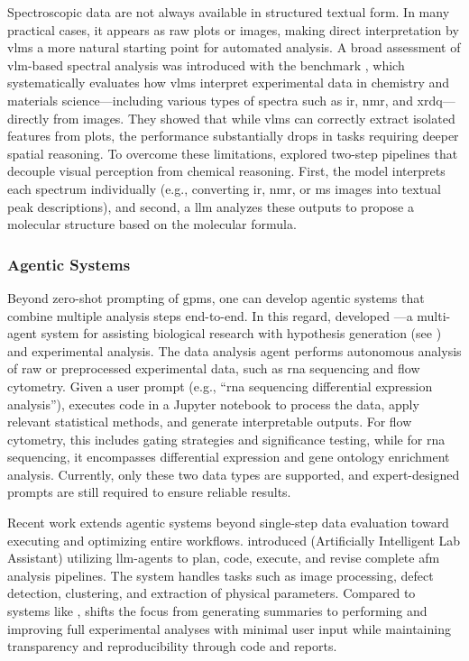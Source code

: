 Spectroscopic data are not always available in structured textual form. 
In many practical cases, it appears as raw plots or images, making direct interpretation by \glspl{vlm} a more natural starting point for automated analysis. 
A broad assessment of \gls{vlm}-based spectral analysis was introduced with the  benchmark \autocite{alampara2024probing}, which systematically evaluates how \glspl{vlm} interpret experimental data in chemistry and materials science---including various types of spectra such as \gls{ir}, \gls{nmr}, and \gls{xrd}q---directly from images. They showed that while \glspl{vlm} can correctly extract isolated features from plots, the performance substantially drops in tasks requiring deeper spatial reasoning.
To overcome these limitations, \textcite{kawchak2024high} explored two-step pipelines that decouple visual perception from chemical reasoning. First, the model interprets each spectrum individually (e.g., converting  \gls{ir}, \gls{nmr}, or \gls{ms} images into textual peak descriptions), and second, a \gls{llm} analyzes these outputs to propose a molecular structure based on the molecular formula. 

\subsubsection{Agentic Systems}
Beyond zero-shot prompting of \glspl{gpm}, one can develop agentic systems that combine multiple analysis steps end-to-end. 
In this regard, \textcite{ghareeb2025robin0} developed ---a multi-agent system for assisting biological research with hypothesis generation (see ) and experimental analysis. 
The data analysis agent  performs autonomous analysis of raw or preprocessed experimental data, such as \gls{rna} sequencing and flow cytometry. 
Given a user prompt (e.g., \enquote{\gls{rna} sequencing differential expression analysis}),  executes code in a Jupyter notebook to process the data, apply relevant statistical methods, and generate interpretable outputs. For flow cytometry, this includes gating strategies and significance testing, while for \gls{rna} sequencing, it encompasses differential expression and gene ontology enrichment analysis. 
Currently, only these two data types are supported, and expert-designed prompts are still required to ensure reliable results. 

Recent work extends agentic systems beyond single-step data evaluation toward executing and optimizing entire workflows. \textcite{mandal2024autonomous} introduced  (Artificially Intelligent
Lab Assistant) utilizing \gls{llm}-agents to plan, code, execute, and revise complete \gls{afm} analysis pipelines. 
The system handles tasks such as image processing, defect detection, clustering, and extraction of physical parameters. 
Compared to systems like ,  shifts the focus from generating summaries to performing and improving full experimental analyses with minimal user input while maintaining transparency and reproducibility through code and reports.

